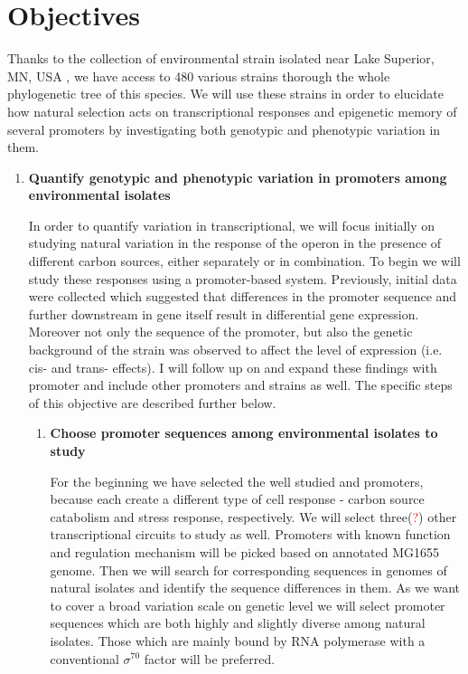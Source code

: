 \chapter*{Objectives}

\shorthandoff{-} 

Thanks to the collection of environmental  strain isolated near Lake Superior, MN, USA \cite{ishii2006presence}, we have access to 480 various strains thorough the whole phylogenetic tree of this species.
We will use these strains in order to elucidate how natural selection acts on transcriptional responses and epigenetic memory of several promoters by investigating both genotypic and phenotypic variation in them.

\begin{enumerate}[font=\bfseries]

	\item \textbf{Quantify genotypic and phenotypic variation in promoters among environmental  isolates}
	
	In order to quantify variation in transcriptional, we will focus initially on studying natural variation in the response of the  operon in the presence of different carbon sources, either separately or in combination.
	To begin we will study these responses using a promoter-based system.
	Previously, initial data were collected which suggested that differences in the  promoter sequence and further downstream in  gene itself result in differential gene expression.
	Moreover not only the sequence of the promoter, but also the genetic background of the strain was observed to affect the level of expression (i.e. cis- and trans- effects).
	I will follow up on and expand these findings with  promoter and include other promoters and strains as well.
	The specific steps of this objective are described further below.

	\begin{enumerate}[font=\bfseries]
	
		\item \textbf{Choose promoter sequences among environmental  isolates to study}
		
		For the beginning we have selected the well studied  and  promoters, because each create a different type of cell response - carbon source catabolism and stress response, respectively.
		We will select three(\textcolor{red}{?}) other transcriptional circuits to study as well.
		Promoters with known function and regulation mechanism will be picked based on annotated MG1655 genome.
		Then we will search for corresponding sequences in genomes of natural isolates and identify the sequence differences in them.
		As we want to cover a broad variation scale on genetic level we will select promoter sequences which are both highly and slightly diverse among natural isolates.
		Those which are mainly bound by RNA polymerase with a conventional $\sigma^{70}$ factor will be preferred.


\end{enumerate}
\end{enumerate}
